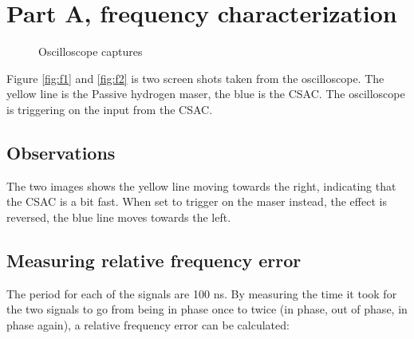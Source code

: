 \documentclass[11pt,english,a4paper]{article}
\begin{document}
\section{Part A, frequency characterization}
\begin{figure}[!htb]
  \centering
  \hfill
  \caption{Oscilloscope captures}
\end{figure}
Figure \ref{fig:f1} and \ref{fig:f2} is two screen shots taken from the oscilloscope. The yellow line is the Passive hydrogen maser, the blue is the CSAC. The oscilloscope is triggering on the input from the CSAC. 

\subsection{Observations}
The two images shows the yellow line moving towards the right, indicating that the CSAC is a bit fast. When set to trigger on the maser instead, the effect is reversed, the blue line moves towards the left. 

\subsection{Measuring relative frequency error}
The period for each of the signals are 100 ns. By measuring the time it took for the two signals to go from being in phase once to twice (in phase, out of phase, in phase again), a relative frequency error can be calculated:
\end{document}

